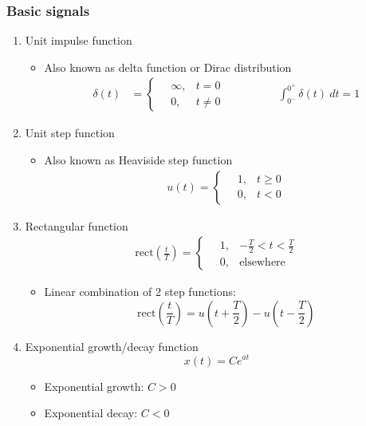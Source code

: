 \documentclass[a4paper]{article}
\begin{document}
\subsubsection{Basic signals}
\begin{enumerate}[label=\alph*.]
    \item Unit impulse function
    \begin{itemize}
        \item Also known as delta function or Dirac distribution
        \begin{align*}
            \delta(t) &= \begin{cases}
            \quad \infty, & t = 0\\
            \quad 0, & t \neq 0
            \end{cases}
            \hspace{2cm} \int_{0^-}^{0^+}\delta(t) \ dt = 1
        \end{align*}
    \end{itemize}
    \item Unit step function
    \begin{itemize}
        \item Also known as Heaviside step function
        \begin{align*}
            u(t) = \begin{cases}
            \quad 1, & t \geq 0\\
            \quad 0, & t < 0
            \end{cases}
        \end{align*}
    \end{itemize}
    \item Rectangular function
    \begin{align*}
        \text{rect}\left(\frac{t}{T}\right) = \begin{cases}
        \quad 1, & -\frac{T}{2} < t < \frac{T}{2}\\
        \quad 0, & \text{elsewhere}
        \end{cases}
    \end{align*}
    \begin{itemize}
        \item Linear combination of 2 step functions:
        $$\text{rect}\left(\frac{t}{T}\right) = u\left(t+\frac{T}{2}\right) - u\left(t-\frac{T}{2}\right)$$
    \end{itemize}
    \item Exponential growth/decay function
    $$x(t) = Ce^{at}$$
    \begin{itemize}
        \item Exponential growth: $C>0$
        \item Exponential decay: $C<0$
    \end{itemize}
\end{enumerate}
\end{document}
